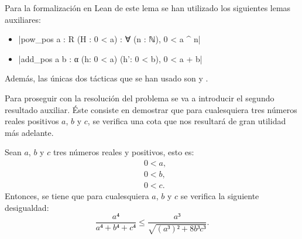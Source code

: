Para la formalización en Lean de este lema se han utilizado los
siguientes lemas auxiliares:
\begin{itemize}
\item {}|pow_pos {a : R} (H : 0 < a) : ∀ (n : ℕ), 0 < a ^ n|
\item {}|add_pos {a b : α} (h: 0 < a) (h': 0 < b), 0 < a + b|
\end{itemize}

Además, las únicas dos tácticas que se han usado son
 y
.

Para proseguir con la resolución del problema se va a introducir el
segundo resultado auxiliar. Éste consiste en demostrar que para
cualesquiera tres números reales positivos \(a\), \(b\) y \(c\), se
verifica una cota que nos resultará de gran utilidad más adelante.

\begin{lema}[cota]\label{lemacota}
  Sean \(a\), \(b\) y \(c\) tres números reales y positivos, esto es:
  \begin{align}
    &0 < a, \label{haq22}\tag{ha}\\
    &0 < b, \label{hbq22}\tag{hb}\\
    &0 < c. \label{hcq22}\tag{hc}
  \end{align}
  Entonces, se tiene que para cualesquiera \(a\), \(b\) y \(c\) se
  verifica la siguiente desigualdad:
  \begin{equation}\label{eqcota}
    \frac{a⁴}{a⁴+b⁴+c⁴} ≤ \frac{a³}{\sqrt{(a³)²+8b³c³}}.
  \end{equation}
\end{lema}

